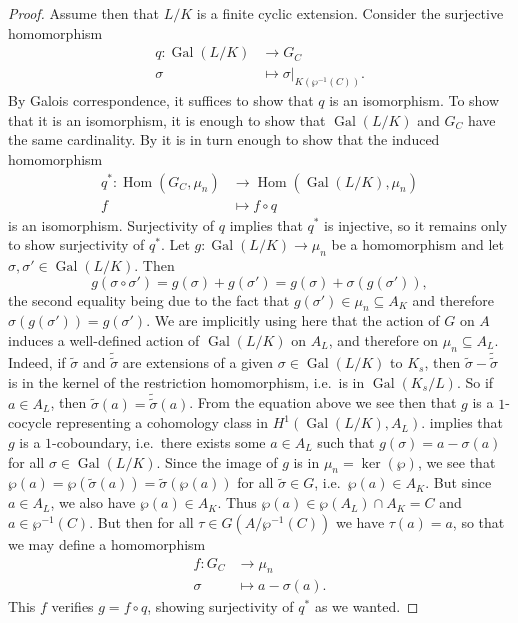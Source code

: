 \documentclass[12pt]{amsart}
\DeclareMathOperator{\Hom}{Hom}
\DeclareMathOperator{\Gal}{Gal}
\begin{document}
\begin{thm}
\begin{proof}
	Assume then that $L/K$ is a finite cyclic extension.
	Consider the surjective homomorphism
	\begin{align*}
	    q\colon \Gal(L/K) & \longrightarrow G_{C} \\
	    \sigma & \longmapsto \sigma|_{K(\wp^{-1}(C))}.
	\end{align*}
	By Galois correspondence, it suffices to show that $q$ is an isomorphism.
	To show that it is an isomorphism, it is enough to show that $\Gal(L/K)$ and $G_{C}$ have the same cardinality.
	By  it is in turn enough to show that the induced homomorphism
	\begin{align*}
	    q^{*}\colon \Hom(G_{C},\mu_{n}) & \longrightarrow \Hom(\Gal(L/K),\mu_{n}) \\
	    f & \longmapsto f\circ q
	\end{align*}
	is an isomorphism.
	Surjectivity of $q$ implies that $q^{*}$ is injective, so it remains only to show surjectivity of $q^{*}$.
	Let $g\colon \Gal(L/K)\to \mu_{n}$ be a homomorphism and let $\sigma,\sigma'\in \Gal(L/K)$.
	Then
	\[ g(\sigma\circ \sigma')=g(\sigma)+g(\sigma')=g(\sigma)+\sigma(g(\sigma')), \]
	the second equality being due to the fact that $g(\sigma')\in \mu_{n}\subseteq A_{K}$ and therefore $\sigma(g(\sigma'))=g(\sigma')$.
	We are implicitly using here that the action of $G$ on $A$ induces a well-defined action of $\Gal(L/K)$ on $A_{L}$, and therefore on $\mu_{n}\subseteq A_{L}$.
	Indeed, if $\tilde{\sigma}$ and $\tilde{\tilde{\sigma}}$ are extensions of a given $\sigma\in \Gal(L/K)$ to $K_{s}$, then $\tilde{\sigma}-\tilde{\tilde{\sigma}}$ is in the kernel of the restriction homomorphism, i.e.~is in $\Gal(K_{s}/L)$.
	So if $a\in A_{L}$, then $\tilde{\sigma}(a)=\tilde{\tilde{\sigma}}(a)$.
	From the equation above we see then that $g$ is a $1$-cocycle representing a cohomology class in $H^{1}(\Gal(L/K),A_{L})$.
	 implies that $g$ is a $1$-coboundary, i.e.~there exists some $a\in A_{L}$ such that $g(\sigma)=a-\sigma(a)$ for all $\sigma\in \Gal(L/K)$.
	Since the image of $g$ is in $\mu_{n}=\ker(\wp)$, we see that $\wp(a)=\wp(\tilde{\sigma}(a))=\tilde{\sigma}(\wp(a))$ for all $\tilde{\sigma} \in G$, i.e.~$\wp(a)\in A_{K}$.
	But since $a\in A_{L}$, we also have $\wp(a)\in A_{K}$.
	Thus $\wp(a)\in \wp(A_{L})\cap A_{K}=C$ and $a\in \wp^{-1}(C)$.
	But then for all $\tau\in G(A/\wp^{-1}(C))$ we have $\tau(a)=a$, so that we may define a homomorphism
	\begin{align*}
	    f\colon G_{C} & \longrightarrow \mu_{n} \\
	    \sigma & \longmapsto a-\sigma(a).
	\end{align*}
	This $f$ verifies $g=f\circ q$, showing surjectivity of $q^{*}$ as we wanted.
    \end{proof}
\end{thm}

\newpage


\vfill
\end{document}
